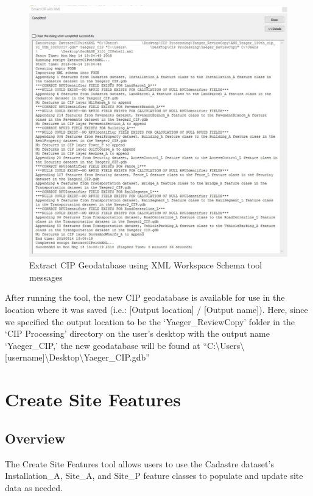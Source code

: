 \documentclass[openany]{book}
\theoremstyle{definition}
\theoremstyle{definition}
\theoremstyle{definition}
\theoremstyle{remark}
\begin{document}
\begin{figure}[H]

{\centering \includegraphics[width=5.07in,]{figures/xCIP-messages} 

}

\caption{Extract CIP Geodatabase using XML Workspace Schema tool messages}\label{fig:xCIPmessages}
\end{figure}

After running the tool, the new CIP geodatabase is available for use in
the location where it was saved (i.e.: {[}Output location{]} / {[}Output
name{]}). Here, since we specified the output location to be the
`Yaeger\_ReviewCopy' folder in the `CIP Processing' directory on the
user's desktop with the output name `Yaeger\_CIP,' the new geodatabase
will be found at
``C:\textbackslash{}Users\textbackslash{}{[}username{]}\textbackslash{}Desktop\textbackslash{}Yaeger\_CIP.gdb''

\chapter{Create Site Features}\label{siteData}

\section{Overview}\label{overview-1}

The Create Site Features tool allows users to use the Cadastre dataset's
Installation\_A, Site\_A, and Site\_P feature classes to populate and
update site data as needed.
\end{document}
